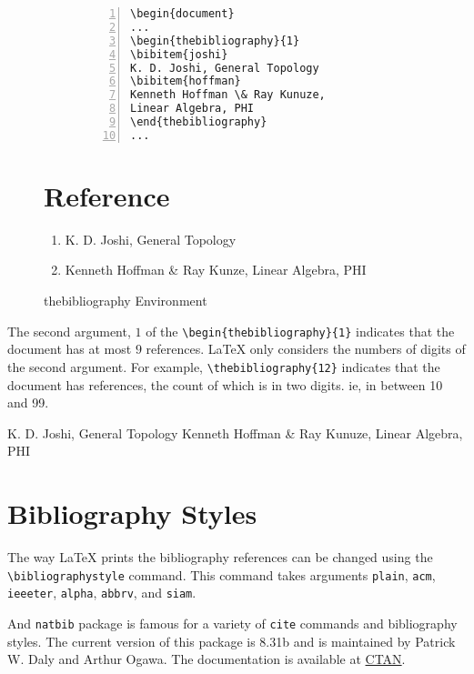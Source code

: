 \documentclass{article}
\theoremstyle{definition}
\theoremstyle{remark}
\begin{document}
\begin{figure}[h]
\centering
\begin{subfigure}{0.45\textwidth}
\begin{Verbatim}[numbers = left]
\begin{document}
...
\begin{thebibliography}{1}
\bibitem{joshi}
K. D. Joshi, General Topology
\bibitem{hoffman}
Kenneth Hoffman \& Ray Kunuze,
Linear Algebra, PHI
\end{thebibliography}
...
\end{Verbatim}
\end{subfigure}
\begin{minipage}{0.45\textwidth}
\section*{Reference}
\begin{enumerate}
	\item K. D. Joshi, General Topology
	\item Kenneth Hoffman \& Ray Kunze, Linear Algebra, PHI
\end{enumerate}
\end{minipage}
\caption{thebibliography Environment}
\label{fig:bib}
\end{figure}

	The second argument, $1$ of the \texttt{\textbackslash begin\{thebibliography\}\{1\}} indicates that the document has at most $9$ references. \LaTeX{} only considers the numbers of digits of the second argument. For example, \texttt{\textbackslash thebibliography\{12\}} indicates that the document has references, the count of which is in two digits. ie, in between 10 and 99.

\begin{thebibliography}{1}
 K. D. Joshi, General Topology
 Kenneth Hoffman \& Ray Kunuze, Linear Algebra, PHI
\end{thebibliography}

\section{Bibliography Styles}
	The way \LaTeX{} prints the bibliography references can be changed using the \texttt{\textbackslash bibliographystyle} command. This command takes arguments \texttt{plain}, \texttt{acm}, \texttt{ieeeter}, \texttt{alpha}, \texttt{abbrv}, and \texttt{siam}.

	And \texttt{natbib} package is famous for a variety of \texttt{cite} commands and bibliography styles. The current version of this package is 8.31b and is maintained by Patrick W. Daly and Arthur Ogawa. The documentation is available at \href{https://ctan.org/pkg/natbib}{CTAN}.
\end{document}
